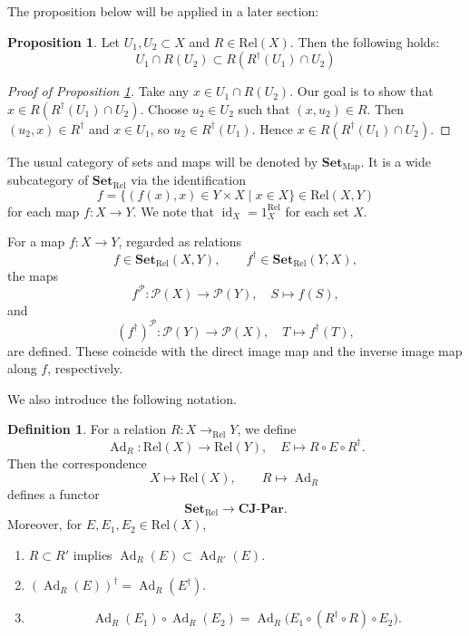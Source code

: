 \documentclass[12pt, a4paper]{amsart}
\theoremstyle{definition}
\newtheorem{proposition}[theorem]{Proposition}
\newtheorem{definition}[theorem]{Definition}
\newcommand{\Ad}{\mathop{\mathrm{Ad}}\nolimits}
\newcommand{\id}{\mathop{\mathrm{id}}\nolimits}
\newcommand{\Rel}{\mathrm{Rel}}
\newcommand{\map}{\mathrm{Map}}
\newcommand{\CompJoinParOrd}{\mathbf{CJ}\text{-}\mathbf{Par}}
\newcommand{\Set}{{\mathbf{Set}}}
\begin{document}
The proposition below will be applied in a later section:

\begin{proposition}\label{proposition:U1U2R}
Let $U_1,U_2 \subset X$ and $R \in \Rel(X)$.
Then the following holds:
\[
U_1 \cap R(U_2) \subset R(R^\dagger (U_1) \cap U_2) 
\]    
\end{proposition}

\begin{proof}[Proof of Proposition \ref{proposition:U1U2R}]
Take any $x \in U_1 \cap R(U_2)$. Our goal is to show that $x \in R(R^\dagger(U_1) \cap U_2)$. Choose $u_2 \in U_2$ such that $(x,u_2) \in R$. Then $(u_2,x) \in R^\dagger$ and $x \in U_1$, so $u_2 \in R^\dagger(U_1)$. Hence $x \in R(R^\dagger(U_1) \cap U_2)$.
\end{proof}

The usual category of sets and maps will be denoted by $\Set_{\map}$.
It is a wide subcategory of $\Set_{\Rel}$ via the identification
\[
f
=
\{
(f(x),x)\in Y\times X
\mid
x\in X
\}
\in\Rel(X,Y)
\]
for each map $f:X\to Y$.
We note that $\id_X=1_X^{\Rel}$ for each set $X$.

For a map $f:X\to Y$, regarded as relations
\[
f\in\Set_{\Rel}(X,Y),
\qquad
f^\dagger\in\Set_{\Rel}(Y,X),
\]
the maps
\[
f^{\mathcal{P}}
:
\mathcal{P}(X)\to\mathcal{P}(Y),
\quad
S\mapsto f(S),
\]
and
\[
(f^\dagger)^{\mathcal{P}}
:
\mathcal{P}(Y)\to\mathcal{P}(X),
\quad
T\mapsto f^\dagger(T),
\]
are defined.
These coincide with the direct image map and the inverse image map along
$f$, respectively.

We also introduce the following notation.

\begin{definition}
For a relation
$R:X\rightarrow_{\Rel}Y$,
we define
\[
\Ad_R
:
\Rel(X)
\rightarrow
\Rel(Y),
\quad
E
\mapsto
R\circ E\circ R^\dagger.
\]
Then the correspondence
\[
X\mapsto\Rel(X),
\qquad
R\mapsto\Ad_R
\]
defines a functor
\[
\Set_{\Rel}
\rightarrow
\CompJoinParOrd.
\]
Moreover, for $E,E_1,E_2\in\Rel(X)$,
\begin{enumerate}
\item
$R\subset R'$ implies
$\Ad_R(E)\subset\Ad_{R'}(E)$.

\item
$(\Ad_R(E))^\dagger=\Ad_R(E^\dagger)$.

\item
\[
\Ad_R(E_1)\circ\Ad_R(E_2)
=
\Ad_R\bigl(E_1\circ(R^\dagger\circ R)\circ E_2\bigr).
\]
\end{enumerate}
\end{definition}
\end{document}
